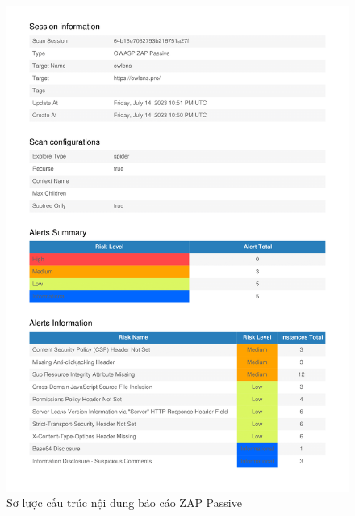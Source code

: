 \begin{figure}[H]
      \centering
      \includegraphics[width=\textwidth]{applied-thesis-chapters/chapter-6/Sơ lược cấu trúc nội dung báo cáo ZAP Passive.png}
      \caption{Sơ lược cấu trúc nội dung báo cáo ZAP Passive}
      \label{fig:SoLuocCauTrucNoiDungBaoCaoZapPassive}
\end{figure}

